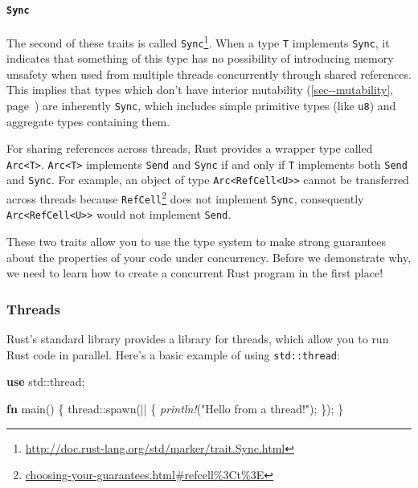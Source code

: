 \documentclass[a4paper,]{book}
\renewcommand*{\hyperref}[2][\ar]{%
  \def\ar{#2}%
  #2 (\autoref{#1}, page~\pageref{#1})}
\newenvironment{Shaded}{\begin{snugshade}}{\end{snugshade}}
\newcommand{\KeywordTok}[1]{\textcolor[rgb]{0.13,0.29,0.53}{\textbf{{#1}}}}
\newcommand{\StringTok}[1]{\textcolor[rgb]{0.31,0.60,0.02}{{#1}}}
\newcommand{\PreprocessorTok}[1]{\textcolor[rgb]{0.56,0.35,0.01}{\textit{{#1}}}}
\newcommand{\NormalTok}[1]{{#1}}
\renewcommand{\href}[2]{#2\footnote{\url{#1}}}
\let\oldparagraph\paragraph
\renewcommand{\paragraph}[1]{\oldparagraph{#1}\mbox{}}
\begin{document}
\paragraph{\texorpdfstring{\texttt{Sync}}{Sync}}\label{sync}

The second of these traits is called
\href{http://doc.rust-lang.org/std/marker/trait.Sync.html}{\texttt{Sync}}.
When a type \texttt{T} implements \texttt{Sync}, it indicates that
something of this type has no possibility of introducing memory unsafety
when used from multiple threads concurrently through shared references.
This implies that types which don't have
\hyperref[sec--mutability]{interior mutability} are inherently
\texttt{Sync}, which includes simple primitive types (like \texttt{u8})
and aggregate types containing them.

For sharing references across threads, Rust provides a wrapper type
called \texttt{Arc\textless{}T\textgreater{}}.
\texttt{Arc\textless{}T\textgreater{}} implements \texttt{Send} and
\texttt{Sync} if and only if \texttt{T} implements both \texttt{Send}
and \texttt{Sync}. For example, an object of type
\texttt{Arc\textless{}RefCell\textless{}U\textgreater{}\textgreater{}}
cannot be transferred across threads because
\href{choosing-your-guarantees.html\#refcell\%3Ct\%3E}{\texttt{RefCell}}
does not implement \texttt{Sync}, consequently
\texttt{Arc\textless{}RefCell\textless{}U\textgreater{}\textgreater{}}
would not implement \texttt{Send}.

These two traits allow you to use the type system to make strong
guarantees about the properties of your code under concurrency. Before
we demonstrate why, we need to learn how to create a concurrent Rust
program in the first place!

\subsubsection{Threads}\label{threads}

Rust's standard library provides a library for threads, which allow you
to run Rust code in parallel. Here's a basic example of using
\texttt{std::thread}:

\begin{Shaded}
\begin{Highlighting}[]
\KeywordTok{use} \NormalTok{std::thread;}

\KeywordTok{fn} \NormalTok{main() \{}
    \NormalTok{thread::spawn(|| \{}
        \PreprocessorTok{println!}\NormalTok{(}\StringTok{"Hello from a thread!"}\NormalTok{);}
    \NormalTok{\});}
\NormalTok{\}}
\end{Highlighting}
\end{Shaded}
\end{document}

